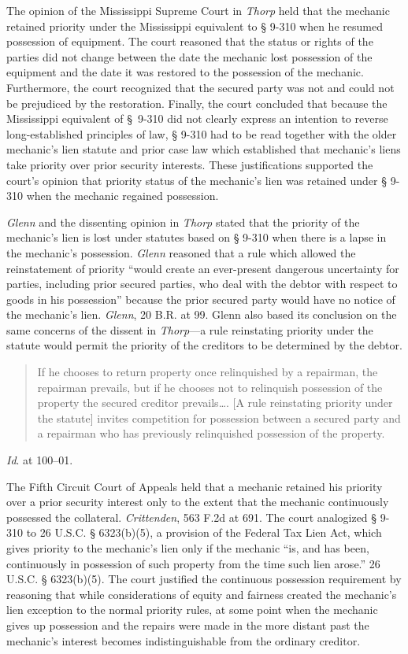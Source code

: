 The opinion of the Mississippi Supreme Court in \textit{Thorp} held that the
mechanic retained priority under the Mississippi equivalent to {\S} 9-310 when
he resumed possession of equipment. The court reasoned that the status or
rights of the parties did not change between the date the mechanic lost
possession of the equipment and the date it was restored to the possession of
the mechanic. Furthermore, the court recognized that the secured party was not
and could not be prejudiced by the restoration. Finally, the court concluded
that because the Mississippi equivalent of {\S}~9-310 did not clearly express
an intention to reverse long-established principles of law, {\S} 9-310 had to
be read together with the older mechanic's lien statute and prior case law
which established that mechanic's liens take priority over prior security
interests. These justifications supported the court's opinion that priority
status of the mechanic's lien was retained under {\S} 9-310 when the mechanic
regained possession.

\textit{Glenn} and the dissenting opinion in \textit{Thorp} stated that the
priority of the mechanic's lien is lost under statutes based on {\S} 9-310
when there is a lapse in the mechanic's possession. \textit{Glenn} reasoned
that a rule which allowed the reinstatement of priority ``would create an
ever-present dangerous uncertainty for parties, including prior secured
parties, who deal with the debtor with respect to goods in his possession''
because the prior secured party would have no notice of the mechanic's lien.
\textit{Glenn}, 20 B.R. at 99. Glenn also based its conclusion on the same
concerns of the dissent in \textit{Thorp}---a rule reinstating priority under
the statute would permit the priority of the creditors to be determined by the
debtor.
\begin{quote}
If he chooses to return property once relinquished by a repairman, the repairman
prevails, but if he chooses not to relinquish possession of the property the
secured creditor prevails\ldots. [A rule reinstating priority under the
statute] invites competition for possession between a secured party and a
repairman who has previously relinquished possession of the property.
\end{quote}
\textit{Id}. at 100--01.

The Fifth Circuit Court of Appeals held that a mechanic retained his priority
over a prior security interest only to the extent that the mechanic
continuously possessed the collateral. \textit{Crittenden}, 563 F.2d at 691.
The court analogized {\S} 9-310 to 26 U.S.C. {\S} 6323(b)(5), a provision of
the Federal Tax Lien Act, which gives priority to the mechanic's lien only if
the mechanic ``is, and has been, continuously in possession of such property
from the time such lien arose.'' 26 U.S.C. {\S} 6323(b)(5). The court justified
the continuous possession requirement by reasoning that while considerations of
equity and fairness created the mechanic's lien exception to the normal
priority rules, at some point when the mechanic gives up possession and the
repairs were made in the more distant past the mechanic's interest becomes
indistinguishable from the ordinary creditor.


